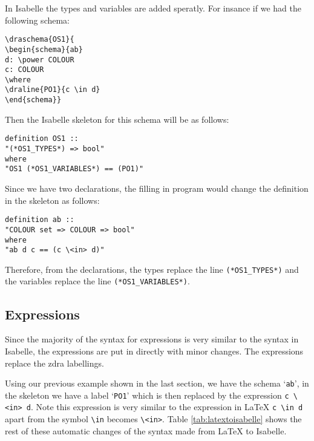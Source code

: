 In Isabelle the types and variables are added speratly. For insance if we had the following schema:

\begin{verbatim}
\draschema{OS1}{
\begin{schema}{ab}
d: \power COLOUR
c: COLOUR
\where
\draline{PO1}{c \in d}
\end{schema}}
\end{verbatim}

Then the Isabelle skeleton for this schema will be as follows:

\begin{verbatim}
definition OS1 ::
"(*OS1_TYPES*) => bool"
where
"OS1 (*OS1_VARIABLES*) == (PO1)"
\end{verbatim}

Since we have two declarations, the filling in program would change the definition in the skeleton as follows:

\begin{verbatim}
definition ab ::
"COLOUR set => COLOUR => bool"
where
"ab d c == (c \<in> d)"
\end{verbatim}

Therefore, from the declarations, the types replace the line \verb|(*OS1_TYPES*)| and the variables replace the line \verb|(*OS1_VARIABLES*)|.

\subsection{Expressions}

Since the majority of the syntax for expressions is very similar to the syntax in Isabelle, the expressions are put in directly with minor changes. The expressions replace the \gls{zdra} labellings.

Using our previous example shown in the last section, we have the schema `\texttt{ab}', in the skeleton we have a label `\texttt{PO1}' which is then replaced by the expression \verb|c \<in> d|. Note this expression is very similar to the expression in \LaTeX{} \verb|c \in d| apart from the symbol \verb|\in| becomes \verb|\<in>|. Table \ref{tab:latextoisabelle} shows the rest of these automatic changes of the syntax made from \LaTeX{} to Isabelle.

